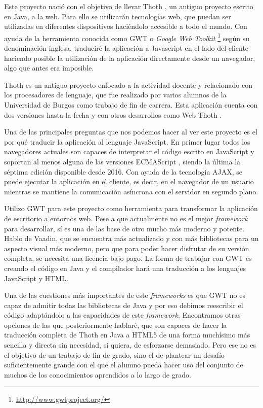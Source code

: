 
Este proyecto nació con el objetivo de llevar Thoth \cite{garcia2007ensenanza}, un antiguo proyecto escrito en Java, a la web. Para ello se utilizarán tecnologías web, que puedan ser utilizadas en diferentes dispositivos haciéndolo accesible a todo el mundo. Con ayuda de la herramienta conocida como GWT o \emph{Google Web Toolkit} \footnote{\url{http://www.gwtproject.org/}} según su denominación inglesa, traduciré la aplicación a Javascript en el lado del cliente haciendo posible la utilización de la aplicación directamente desde un navegador, algo que antes era imposible.

Thoth \cite{garcia2007ensenanza}
 es un antiguo proyecto enfocado a la actividad docente y relacionado con los procesadores de lenguaje, que fue realizado por varios alumnos de la Universidad de Burgos como trabajo de fin de carrera. Esta aplicación cuenta con dos versiones  hasta la fecha y con otros desarrollos como Web Thoth \cite{jute2017}.

Una de las principales preguntas que nos podemos hacer al ver este proyecto es el por qué traducir la aplicación al lenguaje JavaScript. 
En primer lugar todos los navegadores actuales son capaces de interpretar el código escrito en JavaScript y soportan al menos alguna de las versiones ECMAScript \cite{ecma:versiones}, siendo la última la séptima edición disponible desde 2016. Con ayuda de la tecnología AJAX, se puede ejecutar la aplicación en el cliente, es decir, en el navegador de un usuario mientras se mantiene la comunicación asíncrona con el servidor en segundo plano.

Utilizo GWT para este proyecto como herramienta para transformar la aplicación de escritorio a entornos web. Pese a que actualmente no es el mejor \emph{framework} para desarrollar, sí es una de las base de otro mucho más moderno y potente. Hablo de Vaadin, que se encuentra más actualizado y con más bibliotecas para un aspecto visual más moderno, pero que para poder hacer disfrutar de su versión completa, se necesita una licencia bajo pago. La forma de trabajar con GWT es creando el código en Java y el compilador hará una traducción a los lenguajes JavaScript y HTML.

Una de las cuestiones más importantes de este \emph{frameworks} es que GWT no es capaz de admitir todas las bibliotecas de Java y por eso debimos reescribir el código adaptándolo a las capacidades de este \emph{framework}. Encontramos otras opciones de las que posteriormente hablaré, que son capaces de hacer la traducción completa de Thoth en Java a HTML5 de una forma muchísimo más sencilla y directa sin necesidad, si quiera, de esforzarse demasiado. Pero ese no es el objetivo de un trabajo de fin de grado, sino el de plantear un desafío suficientemente grande con el que el alumno pueda hacer uso del conjunto de muchos de los conocimientos aprendidos a lo largo de grado.